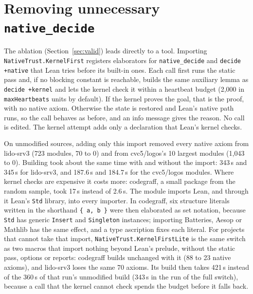 \documentclass[11pt]{article}
\begin{document}
\section{Removing unnecessary \texttt{native\_decide}}\label{sec:remove}
The ablation (Section~\ref{sec:valid}) leads directly to a tool. Importing \texttt{NativeTrust.KernelFirst} registers elaborators for
\texttt{native\_decide} and \texttt{decide +native} that Lean tries before its built-in ones. Each
call first runs the static pass and, if no blocking constant is reachable, builds the same auxiliary
lemma as \texttt{decide +kernel} and lets the kernel check it within a heartbeat budget (2,000 in
\texttt{maxHeartbeats} units by default). If the kernel proves the goal, that is the proof, with
no native axiom. Otherwise the state is restored and Lean's native path runs, so the call
behaves as before, and an info message gives the reason. No call is edited. The kernel attempt
adds only a declaration that Lean's kernel checks.

On unmodified sources, adding only this import removed every native axiom from lido-srv3 (723
modules, 70 to 0) and from cvc5/logos's 10 largest modules (1,043 to 0). Building took about the
same time with and without the import: 343\,s and 345\,s for lido-srv3, and 187.6\,s and 184.7\,s for the
cvc5/logos modules. Where kernel checks are expensive it costs more: codegraff, a small package from the
random sample, took 17\,s instead of 2.6\,s. The module imports Lean, and through it Lean's
\texttt{Std} library, into every importer. In codegraff, six structure literals written in the
shorthand \verb|{ a, b }| were then elaborated as set notation, because \texttt{Std} has generic
\texttt{Insert} and \texttt{Singleton} instances; importing Batteries, Aesop or Mathlib has the same
effect, and a type ascription fixes each literal. For projects that cannot take that import,
\texttt{NativeTrust.KernelFirstLite} is the same switch as two macros that import nothing beyond
Lean's prelude, without the static pass, options or reports: codegraff builds unchanged with it
(88 to 23 native axioms), and lido-srv3 loses the same 70 axioms. Its build then takes 421\,s instead of
the 360\,s of that run's unmodified build (343\,s in the run of the full switch), because a call that
the kernel cannot check spends the budget before it falls back.
\end{document}
